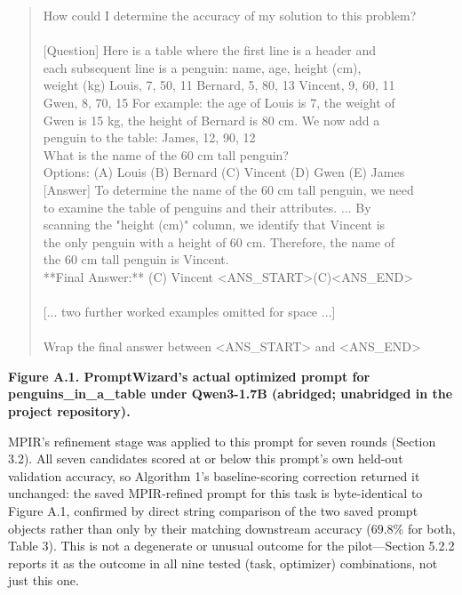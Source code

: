 \documentclass[a4paper,fleqn]{cas-sc}
\begin{document}
\centering
\begin{quote}\ttfamily\small
How could I determine the accuracy of my solution to this problem?\\{}
~\\{}
[Question] Here is a table where the first line is a header and\\{}
each subsequent line is a penguin: name, age, height (cm),\\{}
weight (kg) Louis, 7, 50, 11 Bernard, 5, 80, 13 Vincent, 9, 60, 11\\{}
Gwen, 8, 70, 15  For example: the age of Louis is 7, the weight of\\{}
Gwen is 15 kg, the height of Bernard is 80 cm.  We now add a\\{}
penguin to the table: James, 12, 90, 12\\{}
What is the name of the 60 cm tall penguin?\\{}
Options: (A) Louis (B) Bernard (C) Vincent (D) Gwen (E) James\\{}
[Answer] To determine the name of the 60 cm tall penguin, we need\\{}
to examine the table of penguins and their attributes. ... By\\{}
scanning the "height (cm)" column, we identify that Vincent is\\{}
the only penguin with a height of 60 cm. Therefore, the name of\\{}
the 60 cm tall penguin is Vincent.\\{}
**Final Answer:** (C) Vincent <ANS\_\allowbreak{}START>(C)<ANS\_\allowbreak{}END>\\{}
~\\{}
[... two further worked examples omitted for space ...]\\{}
~\\{}
Wrap the final answer between <ANS\_\allowbreak{}START> and <ANS\_\allowbreak{}END>\\{}
\end{quote}
\par\noindent\textbf{Figure A.1. PromptWizard's actual optimized prompt for penguins\_\allowbreak{}in\_\allowbreak{}a\_\allowbreak{}table under Qwen3-1.7B (abridged; unabridged in the project repository).}

MPIR's refinement stage was applied to this prompt for seven rounds (Section 3.2). All seven candidates scored at or below this prompt's own held-out validation accuracy, so Algorithm 1's baseline-scoring correction returned it unchanged: the saved MPIR-refined prompt for this task is byte-identical to Figure A.1, confirmed by direct string comparison of the two saved prompt objects rather than only by their matching downstream accuracy (69.8\% for both, Table 3). This is not a degenerate or unusual outcome for the pilot---Section 5.2.2 reports it as the outcome in all nine tested (task, optimizer) combinations, not just this one.
\end{document}
